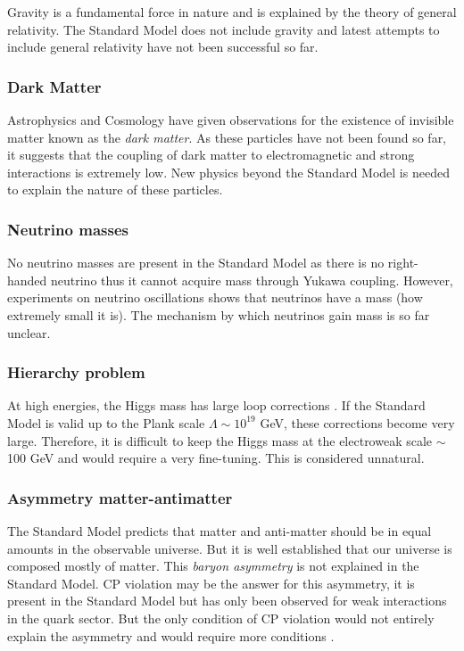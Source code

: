 Gravity is a fundamental force in nature and is explained by the theory of general relativity. The Standard Model does not include gravity and latest attempts to include general relativity have not been successful so far.

\subsubsection*{Dark Matter}

Astrophysics and Cosmology have given observations for the existence of invisible matter known as the \textit{dark matter}. As these particles have not been found so far, it suggests that the coupling of dark matter to electromagnetic and strong interactions is extremely low. New physics beyond the Standard Model is needed to explain the nature of these particles.

\subsubsection*{Neutrino masses}

No neutrino masses are present in the Standard Model as there is no right-handed neutrino thus it cannot acquire mass through Yukawa coupling. However, experiments on neutrino oscillations \cite{Dore:2008dp} shows that neutrinos have a mass (how extremely small it is). The mechanism by which neutrinos gain mass is so far unclear.

\subsubsection*{Hierarchy problem}

At high energies, the Higgs mass has large loop corrections \cite{Vieira:2012ex}. If the Standard Model is valid up to the Plank scale $\Lambda \sim 10^19$ GeV, these corrections become very large. Therefore, it is difficult to keep the Higgs mass at the electroweak scale $\sim$100 GeV and would require a very fine-tuning. This is considered unnatural.

\subsubsection*{Asymmetry matter-antimatter}

The Standard Model predicts that matter and anti-matter should be in equal amounts in the observable universe. But it is well established that our universe is composed mostly of matter. This \textit{baryon asymmetry} is not explained in the Standard Model. CP violation \cite{Ellis:1978hq} may be the answer for this asymmetry, it is present in the Standard Model but has only been observed for weak interactions in the quark sector. But the only condition of CP violation would not entirely explain the asymmetry and would require more conditions \cite{Sakharov:1967dj}.


